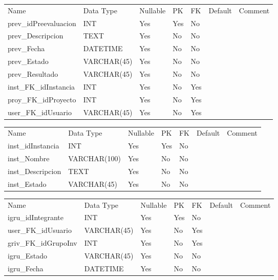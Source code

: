 			\begin{center}
				\begin{tabular}{ |l|l|l|l|l|l|l| }
					\hline
					Name & Data Type & Nullable & PK & FK & Default & Comment \\
					prev_idPreevaluacion & INT & Yes & Yes & No &  & \\ \hline 
prev_Descripcion & TEXT & Yes & No & No &  & \\ \hline 
prev_Fecha & DATETIME & Yes & No & No &  & \\ \hline 
prev_Estado & VARCHAR(45) & Yes & No & No &  & \\ \hline 
prev_Resultado & VARCHAR(45) & Yes & No & No &  & \\ \hline 
inst_FK_idInstancia & INT & Yes & No & Yes &  & \\ \hline 
proy_FK_idProyecto & INT & Yes & No & Yes &  & \\ \hline 
user_FK_idUsuario & VARCHAR(45) & Yes & No & Yes &  & \\ \hline 

				\end{tabular}
			\end{center}
		

			\begin{center}
				\begin{tabular}{ |l|l|l|l|l|l|l| }
					\hline
					Name & Data Type & Nullable & PK & FK & Default & Comment \\
					inst_idInstancia & INT & Yes & Yes & No &  & \\ \hline 
inst_Nombre & VARCHAR(100) & Yes & No & No &  & \\ \hline 
inst_Descripcion & TEXT & Yes & No & No &  & \\ \hline 
inst_Estado & VARCHAR(45) & Yes & No & No &  & \\ \hline 

				\end{tabular}
			\end{center}
		

			\begin{center}
				\begin{tabular}{ |l|l|l|l|l|l|l| }
					\hline
					Name & Data Type & Nullable & PK & FK & Default & Comment \\
					igru_idIntegrante & INT & Yes & Yes & No &  & \\ \hline 
user_FK_idUsuario & VARCHAR(45) & Yes & No & Yes &  & \\ \hline 
griv_FK_idGrupoInv & INT & Yes & No & Yes &  & \\ \hline 
igru_Estado & VARCHAR(45) & Yes & No & No &  & \\ \hline 
igru_Fecha & DATETIME & Yes & No & No &  & \\ \hline 

				\end{tabular}
			\end{center}
		

